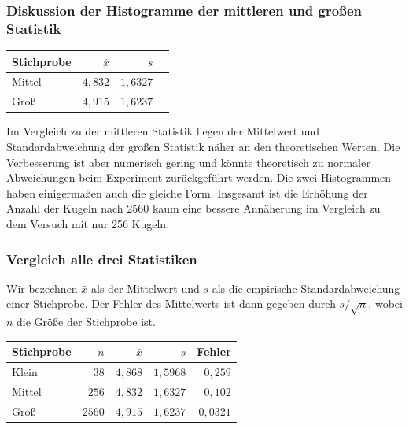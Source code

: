 \documentclass[twoside]{article}
\begin{document}
        \subsubsection*{Diskussion der Histogramme der mittleren und großen Statistik}
        \begin{center}
            \begin{tabular}{l | rrr}
                \toprule
                Stichprobe & $\bar{x}$ & $s$\\
                \midrule
                Mittel & $4,832$ & $1,6327$ \\
                Groß & $4,915$ & $1,6237$ \\
                \bottomrule
            \end{tabular}
        \end{center}
        Im Vergleich zu der mittleren Statistik liegen der Mittelwert und Standardabweichung der großen Statistik näher an den theoretischen Werten. Die Verbesserung ist aber numerisch gering und könnte theoretisch zu normaler Abweichungen beim Experiment zurückgeführt werden. Die zwei Histogrammen haben einigermaßen auch die gleiche Form. Insgesamt ist die Erhöhung der Anzahl der Kugeln nach 2560 kaum eine bessere Annäherung im Vergleich zu dem Versuch mit nur 256 Kugeln.  

        \subsubsection*{Vergleich alle drei Statistiken}
        Wir bezechnen $\bar{x}$ als der Mittelwert und $s$ als die empirische Standardabweichung einer Stichprobe. Der Fehler des Mittelwerts ist dann gegeben durch $s/\sqrt{n}$, wobei $n$ die Größe der Stichprobe ist. 

        \begin{center}
            \begin{tabular}{l | rrrr}
                \toprule
                Stichprobe & $n$ & $\bar{x}$ & $s$ & Fehler \\
                \midrule
                Klein & $38$ & $4,868$ & $1,5968$ & $0,259$ \\
                Mittel & $256$ & $4,832$ & $1,6327$ & $0,102$ \\
                Groß & $2560$ & $4,915$ & $1,6237$ & $0,0321$ \\
                \bottomrule
            \end{tabular}
        \end{center} 
\end{document}
